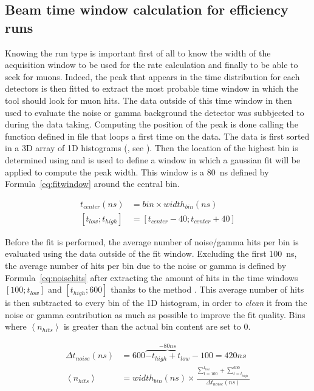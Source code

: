 	\subsection{Beam time window calculation for efficiency runs}
	\label{app2:ssec:beamwindow}
	
	Knowing the run type is important first of all to know the width of the acquisition window to be used for the rate calculation and finally to be able to seek for muons. Indeed, the peak that appears in the time distribution for each detectors is then fitted to extract the most probable time window in which the tool should look for muon hits. The data outside of this time window in then used to evaluate the noise or gamma background the detector was subbjected to during the data taking. Computing the position of the peak is done calling the function  defined in file  that loops a first time on the data. The data is first sorted in a 3D array of 1D histograms (, see ). Then the location of the highest bin is determined using  and is used to define a window in which a gaussian fit will be applied to compute the peak width. This window is a \SI{80}{ns} defined by Formula~\ref{eq:fitwindow} around the central bin.
	
	\begin{subequations}
	\label{eq:fitwindow}
	\begin{align}
		t_{center}(ns) & = bin \times width_{bin}(ns)\\
		[t_{low};t_{high}] & = [t_{center} - 40; t_{center} + 40]
	\end{align}
	\end{subequations}
	
	Before the fit is performed, the average number of noise/gamma hits per bin is evaluated using the data outside of the fit window. Excluding the first \SI{100}{ns}, the average number of hits per bin due to the noise or gamma is defined by Formula~\ref{eq:noisehits} after extracting the amount of hits in the time windows $[100;t_{low}]$ and $[t_{high};600]$ thanks to the method . This average number of hits is then subtracted to every bin of the 1D histogram, in order to \textit{clean} it from the noise or gamma contribution as much as possible to improve the fit quality. Bins where $\left\langle n_{hits} \right\rangle$ is greater than the actual bin content are set to 0.
	
	\begin{subequations}
	\label{eq:noisehits}
	\begin{align}
		\Delta t_{noise}(ns) & = 600 \overbrace{- t_{high} + t_{low}}^{-80ns} - 100 = 420ns \\
		\left\langle n_{hits} \right\rangle & = width_{bin}(ns) \times \frac{\sum_{t=100}^{t_{low}}+\sum_{t=t_{high}}^{600}}{\Delta t_{noise}(ns)}
	\end{align}
	\end{subequations}
	
